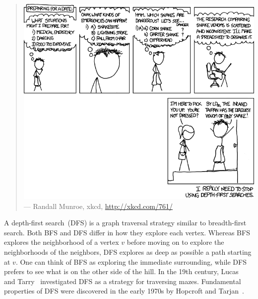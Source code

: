\begin{quote}
\footnotesize
\includegraphics[scale=0.5]{image/graph-algorithms/depth-first-search} \\
\noindent
--- Randall Munroe, xkcd,
\url{http://xkcd.com/761/}
\end{quote}

\noindent
A depth-first search~(DFS) is a
graph traversal strategy similar to breadth-first
search. Both BFS and
DFS differ in how they explore each vertex. Whereas
BFS explores the neighborhood of a vertex $v$ before moving
on to explore the neighborhoods of the neighbors, DFS
explores as deep as possible a path starting at $v$. One can think of
BFS as exploring the immediate surrounding, while
DFS prefers to see what is on the other side of the
hill. In the 19th century,
Lucas~\cite{Lucas1882.1894} and
Tarry~\cite{Tarry1895} investigated
DFS as a strategy for traversing
mazes. Fundamental properties of DFS were
discovered in the early 1970s by
Hopcroft and
Tarjan~\cite{HopcroftTarjan1973,Tarjan1972}.

